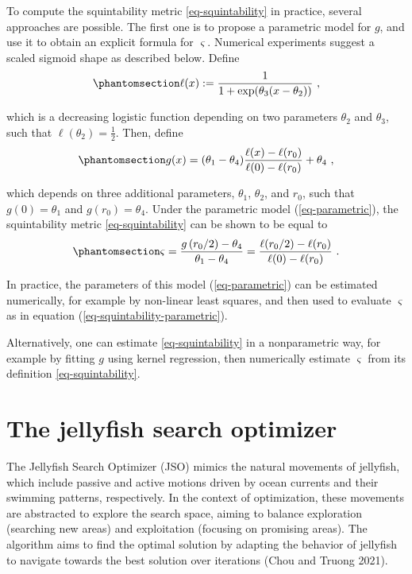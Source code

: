 \documentclass[
  12pt,
]{interact}
\theoremstyle{plain}
\begin{document}
To compute the squintability metric \eqref{eq-squintability} in
practice, several approaches are possible. The first one is to propose a
parametric model for \(g\), and use it to obtain an explicit formula for
\(\varsigma\). Numerical experiments suggest a scaled sigmoid shape as
described below. Define
\begin{equation}\phantomsection\label{eq-logistic}{
\ell(x):=\frac{1}{1+\exp(\theta_{3}(x-\theta_{2}))}\ ,
}\end{equation}

which is a decreasing logistic function depending on two parameters
\(\theta_2\) and \(\theta_3\), such that
\(\ell(\theta_{2})=\frac{1}{2}\). Then, define
\begin{equation}\phantomsection\label{eq-parametric}{
g(x)=(\theta_{1}-\theta_{4})\frac{\ell(x)-\ell(r_0)}{\ell(0)-\ell(r_0)}+\theta_{4}\ ,
}\end{equation}

which depends on three additional parameters, \(\theta_1\),
\(\theta_2\), and \(r_0\), such that \(g(0)=\theta_1\) and
\(g(r_0)=\theta_4\). Under the parametric model (\ref{eq-parametric}),
the squintability metric \eqref{eq-squintability} can be shown to be
equal to
\begin{equation}\phantomsection\label{eq-squintability-parametric}{
\varsigma=\frac{g\left(r_{0}/2\right)-\theta_{4}}{\theta_{1}-\theta_{4}}=\frac{\ell(r_0/2)-\ell(r_0)}{\ell(0)-\ell(r_0)}\ .
}\end{equation}

In practice, the parameters of this model (\ref{eq-parametric}) can be
estimated numerically, for example by non-linear least squares, and then
used to evaluate \(\varsigma\) as in equation
(\ref{eq-squintability-parametric}).

Alternatively, one can estimate \eqref{eq-squintability} in a
nonparametric way, for example by fitting \(g\) using kernel regression,
then numerically estimate \(\varsigma\) from its definition
\eqref{eq-squintability}.

\section{The jellyfish search optimizer}\label{sec-JSO}

The Jellyfish Search Optimizer (JSO) mimics the natural movements of
jellyfish, which include passive and active motions driven by ocean
currents and their swimming patterns, respectively. In the context of
optimization, these movements are abstracted to explore the search
space, aiming to balance exploration (searching new areas) and
exploitation (focusing on promising areas). The algorithm aims to find
the optimal solution by adapting the behavior of jellyfish to navigate
towards the best solution over iterations (Chou and Truong 2021).
\end{document}
